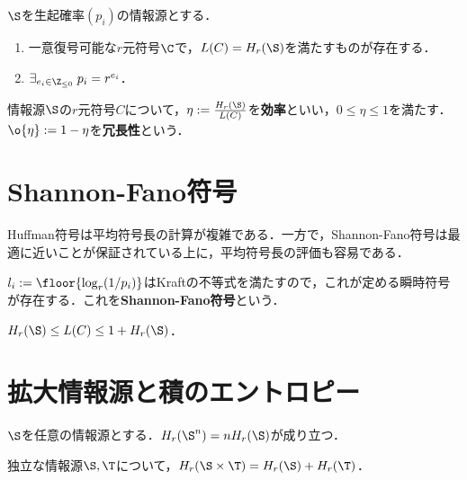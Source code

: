 \documentclass[uplatex,dvipdfmx]{jsreport}
\begin{document}
\begin{corollary}
    $\S$を生起確率$(p_i)$の情報源とする．
    \begin{enumerate}
        \item 一意復号可能な$r$元符号$\C$で，$L(C)=H_r(\S)$を満たすものが存在する．
        \item $\exists_{e_i\in\Z_{\le0}}\;p_i=r^{e_i}$．
    \end{enumerate}
\end{corollary}

\begin{definition}
    情報源$\S$の$r$元符号$C$について，$\eta:=\frac{H_r(\S)}{L(C)}$を\textbf{効率}といい，$0\le\eta\le1$を満たす．
    $\o{\eta}:=1-\eta$を\textbf{冗長性}という．
\end{definition}

\section{Shannon-Fano符号}

\begin{tcolorbox}[colframe=ForestGreen, colback=ForestGreen!10!white,breakable,colbacktitle=ForestGreen!40!white,coltitle=black,fonttitle=\bfseries\sffamily,
title=]
    Huffman符号は平均符号長の計算が複雑である．一方で，Shannon-Fano符号は最適に近いことが保証されている上に，平均符号長の評価も容易である．
\end{tcolorbox}

\begin{definition}
    $l_i:=\floor{\log_r(1/p_i)}$はKraftの不等式を満たすので，これが定める瞬時符号が存在する．これを\textbf{Shannon-Fano符号}という．
\end{definition}

\begin{proposition}
    $H_r(\S)\le L(C)\le 1+H_r(\S)$．
\end{proposition}

\section{拡大情報源と積のエントロピー}

\begin{theorem}
    $\S$を任意の情報源とする．$H_r(\S^n)=nH_r(\S)$が成り立つ．
\end{theorem}

\begin{theorem}
    独立な情報源$\S,\T$について，$H_r(\S\times\T)=H_r(\S)+H_r(\T)$．
\end{theorem}
\end{document}
